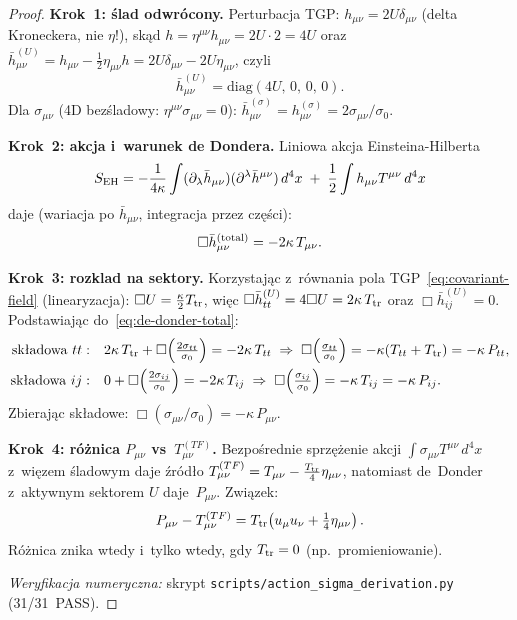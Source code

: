\begin{proof}
\textbf{Krok~1: \'slad odwr\'ocony.}
Perturbacja TGP: $h_{\mu\nu} = 2U\delta_{\mu\nu}$
(delta Kroneckera, nie $\eta$!), sk\k{a}d
$h = \eta^{\mu\nu}h_{\mu\nu} = 2U\cdot 2 = 4U$
oraz~$\bar h^{(U)}_{\mu\nu} = h_{\mu\nu} - \tfrac{1}{2}\eta_{\mu\nu}h
= 2U\delta_{\mu\nu} - 2U\eta_{\mu\nu}$,
czyli
\[
  \bar h^{(U)}_{\mu\nu} = \mathrm{diag}(4U,\,0,\,0,\,0).
\]
Dla $\sigma_{\mu\nu}$ (4D bezśladowy: $\eta^{\mu\nu}\sigma_{\mu\nu}=0$):
$\bar h^{(\sigma)}_{\mu\nu} = h^{(\sigma)}_{\mu\nu} = 2\sigma_{\mu\nu}/\sigma_0$.

\textbf{Krok~2: akcja i~warunek de Dondera.}
Liniowa akcja Einsteina-Hilberta
\[
  S_{\rm EH} = -\frac{1}{4\kappa}\int(\partial_\lambda\bar h_{\mu\nu})
    (\partial^\lambda\bar h^{\mu\nu})\,d^4x
    \;+\;\frac{1}{2}\int h_{\mu\nu}T^{\mu\nu}\,d^4x
\]
daje (wariacja po $\bar h_{\mu\nu}$, integracja przez cz\k{e}\'sci):
\begin{equation}\label{eq:de-donder-total}
  \Box\bar h^{(\rm total)}_{\mu\nu} = -2\kappa\,T_{\mu\nu}.
\end{equation}

\textbf{Krok~3: rozkl{}ad na sektory.}
Korzystaj\k{a}c z~r\'ownania pola TGP~\eqref{eq:covariant-field}
(linearyzacja): $\Box U = \tfrac{\kappa}{2}T_{\rm tr}$, wi\k{e}c
$\Box\bar h^{(U)}_{tt} = 4\Box U = 2\kappa\,T_{\rm tr}$
oraz $\Box\bar h^{(U)}_{ij}=0$.
Podstawiaj\k{a}c do~\eqref{eq:de-donder-total}:
\begin{align*}
  \text{sk\l{}adowa }tt:\quad
  &2\kappa\,T_{\rm tr} + \Box\!\left(\tfrac{2\sigma_{tt}}{\sigma_0}\right)
    = -2\kappa\,T_{tt}
  \;\Rightarrow\;
  \Box\!\left(\tfrac{\sigma_{tt}}{\sigma_0}\right)
  = -\kappa(T_{tt}+T_{\rm tr}) = -\kappa\,P_{tt},\\
  \text{sk\l{}adowa }ij:\quad
  &0 + \Box\!\left(\tfrac{2\sigma_{ij}}{\sigma_0}\right) = -2\kappa\,T_{ij}
  \;\Rightarrow\;
  \Box\!\left(\tfrac{\sigma_{ij}}{\sigma_0}\right) = -\kappa\,T_{ij} = -\kappa\,P_{ij}.
\end{align*}
Zbieraj\k{a}c sk\l{}adowe: $\Box(\sigma_{\mu\nu}/\sigma_0) = -\kappa\,P_{\mu\nu}$.

\textbf{Krok~4: r\'o\.znica $P_{\mu\nu}$ vs~$T^{(TF)}_{\mu\nu}$.}
Bezpo\'srednie sprz\k{e}\.zenie akcji $\int\sigma_{\mu\nu}T^{\mu\nu}\,d^4x$
z~wi\k{e}zem \'sladowym daje \'zr\'od\l{}o $T^{(TF)}_{\mu\nu}
= T_{\mu\nu} - \tfrac{T_{\rm tr}}{4}\eta_{\mu\nu}$,
natomiast de~Donder z~aktywnym sektorem $U$ daje~$P_{\mu\nu}$.
Zwi\k{a}zek:
\begin{equation}\label{eq:P-vs-TTF}
  P_{\mu\nu} - T^{(TF)}_{\mu\nu}
  = T_{\rm tr}\!\left(u_\mu u_\nu + \tfrac{1}{4}\eta_{\mu\nu}\right).
\end{equation}
R\'o\.znica znika wtedy i~tylko wtedy, gdy $T_{\rm tr}=0$
(np.\ promieniowanie).

\noindent\emph{Weryfikacja numeryczna:}
skrypt \texttt{scripts/action\_sigma\_derivation.py} (31/31~PASS).
\end{proof}

